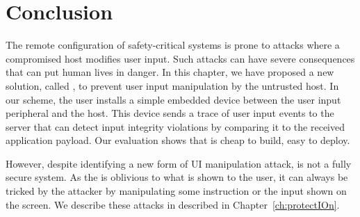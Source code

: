 
\section{Conclusion}
\label{sec:conclusion_IK}

The remote configuration of safety-critical systems is prone to attacks where a compromised host modifies user input. Such attacks can have severe consequences that can put human lives in danger. In this chapter, we have proposed a new solution, called \name, to prevent user input manipulation by the untrusted host. In our scheme, the user installs a simple embedded device between the user input peripheral and the host. This device sends a trace of user input events to the server that can detect input integrity violations by comparing it to the received application payload. Our evaluation shows that \name is cheap to build, easy to deploy.

However, despite identifying a new form of UI manipulation attack, \integrikey is not a fully secure system. As the \device is oblivious to what is shown to the user, it can always be tricked by the attacker by manipulating some instruction or the input shown on the screen. We describe these attacks in \protection described in Chapter~\ref{ch:protectIOn}.
